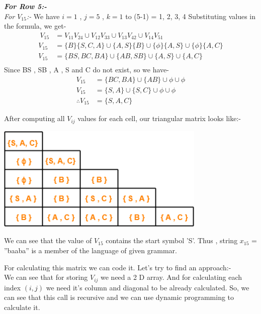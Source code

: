 \documentclass[12pt]{book}
\begin{document}
\textbf{\textit{For Row 5:-}}\\
\textit{For $V_{15}$:-}\newline
We have $i = 1$ , $j = 5$ , $k = 1$ to (5-1) = 1, 2, 3, 4\newline
Substituting values in the formula, we get-
\begin{align*}\
V_{15} &= V_{11} V_{24} \cup V_{12} V_{33} \cup V_{13} V_{42} \cup V_{14} V_{51}\\
V_{15} &= \{ B\} \{ S, C, A \} \cup \{ A, S \} \{ B \} \cup \{ \phi \} \{ A, S \} \cup \{ \phi \} \{ A, C \}\\
V_{15} &= \{ BS, BC, BA \} \cup \{AB, SB\} \cup \{ A, S \} \cup \{A, C\}\\
\end{align*}
Since BS , SB , A , S and C do not exist, so we have-
\begin{align*}
V_{15} &= \{BC, BA\} \cup \{ AB \} \cup \phi \cup \phi\\
V_{15} &= \{S, A\} \cup \{ S, C \} \cup \phi \cup \phi\\
\therefore V_{15} &= \{ S, A, C \}
\end{align*}

After computing all $V_{ij}$ values for each cell, our triangular matrix looks like:-\\

\begin{center}
    \includegraphics[width =10cm]{CYK-2.png}    
\end{center}

We can see that the value of $V_{15}$ contains the start symbol 'S'. Thus , string $x_{15}$ = ''baaba'' is a member of the language of given grammar.\newline

For calculating this matrix we can code it. Let's try to find an approach:-\\
We can see that for storing $V_{ij}$ we need a 2 D array. And for calculating each index $(i, j)$ we need it's column and diagonal to be already calculated. So, we can see that this call is recursive and we can use dynamic programming to calculate it.\\
\end{document}
